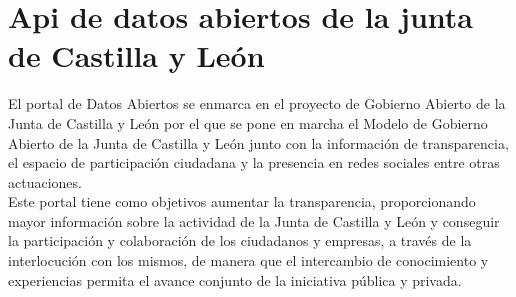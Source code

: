 \section{Api de datos abiertos de la junta de Castilla y León}
El portal de Datos Abiertos se enmarca en el proyecto de Gobierno Abierto de la Junta de Castilla y León por el que se pone en marcha el Modelo de Gobierno Abierto de la Junta de Castilla y León junto con la información de transparencia, el espacio de participación ciudadana   y la presencia en redes sociales entre otras actuaciones.\\
Este portal tiene como objetivos aumentar la transparencia, proporcionando mayor información sobre la actividad de la Junta de Castilla y León y conseguir la participación y colaboración de los ciudadanos y empresas, a través de la interlocución con los mismos, de manera que el intercambio de conocimiento y experiencias permita el avance conjunto de la iniciativa pública y privada.\cite{datosab}\\
